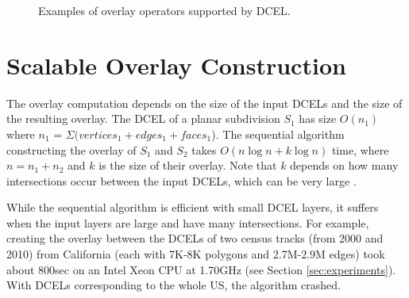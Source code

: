 \begin{figure}
    \centering
    
    \caption{Examples of overlay operators supported by DCEL.}\label{fig:overlay_operations}
\end{figure}

\section{Scalable Overlay Construction} \label{sec:methods}

The overlay computation depends on the size of the input DCELs and the size of the resulting overlay. The DCEL of a planar subdivision $S_1$ has size $O(n_1)$ where $n_1$ = $\Sigma (vertices_1 + edges_1 + faces_1$). 
The sequential algorithm constructing the overlay of $S_1$ and $S_2$ takes $O(n \log n + k \log n)$ time, where $n = n_1 + n_2$ and $k$ is the size of their overlay.
Note that $k$ depends on how many intersections occur between the input DCELs, which can be very large \cite{berg_computational_2008}. 

While the sequential algorithm is efficient with small DCEL layers, it suffers when the input layers are large and have many intersections. 
For example, creating the overlay between the DCELs of two census tracks (from 2000 and 2010) from California (each with 7K-8K polygons and 2.7M-2.9M edges) took about 800sec on an Intel Xeon CPU at 1.70GHz (see Section \ref{sec:experiments}). 
With DCELs corresponding to the whole US, the algorithm crashed. 

